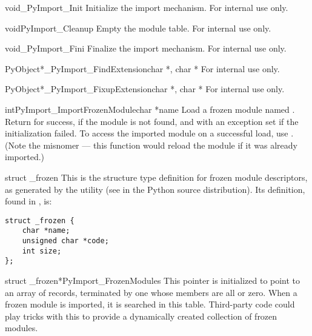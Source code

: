 \begin{cfuncdesc}{void}{_PyImport_Init}{}
  Initialize the import mechanism.  For internal use only.
\end{cfuncdesc}

\begin{cfuncdesc}{void}{PyImport_Cleanup}{}
  Empty the module table.  For internal use only.
\end{cfuncdesc}

\begin{cfuncdesc}{void}{_PyImport_Fini}{}
  Finalize the import mechanism.  For internal use only.
\end{cfuncdesc}

\begin{cfuncdesc}{PyObject*}{_PyImport_FindExtension}{char *, char *}
  For internal use only.
\end{cfuncdesc}

\begin{cfuncdesc}{PyObject*}{_PyImport_FixupExtension}{char *, char *}
  For internal use only.
\end{cfuncdesc}

\begin{cfuncdesc}{int}{PyImport_ImportFrozenModule}{char *name}
  Load a frozen module named .  Return  for success,
   if the module is not found, and  with an exception
  set if the initialization failed.  To access the imported module on
  a successful load, use .  (Note
  the misnomer --- this function would reload the module if it was
  already imported.)
\end{cfuncdesc}

\begin{ctypedesc}[_frozen]{struct _frozen}
  This is the structure type definition for frozen module descriptors,
  as generated by the  utility
  (see  in the Python source distribution).  Its
  definition, found in , is:

\begin{verbatim}
struct _frozen {
    char *name;
    unsigned char *code;
    int size;
};
\end{verbatim}
\end{ctypedesc}

\begin{cvardesc}{struct _frozen*}{PyImport_FrozenModules}
  This pointer is initialized to point to an array of  records, terminated by one whose members are all \NULL{} or
  zero.  When a frozen module is imported, it is searched in this
  table.  Third-party code could play tricks with this to provide a
  dynamically created collection of frozen modules.
\end{cvardesc}

